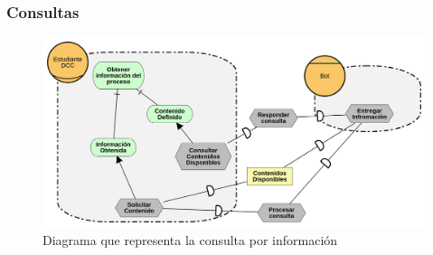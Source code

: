     \subsubsection{Consultas}
        \begin{figure}[ht]
            \centering
            \includegraphics[width=\textwidth]{media/imagenes/i_star/diagramas/Consultas.png}
            \caption[Diagrama i* Consultas]{Diagrama que representa la consulta por información}
            \label{}
        \end{figure}

